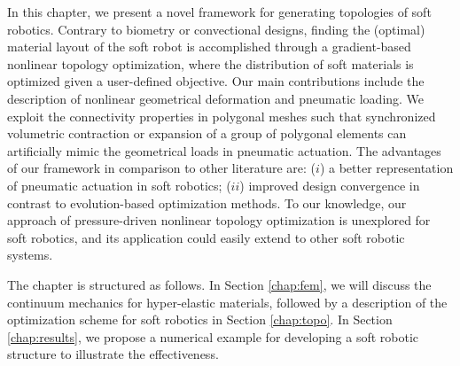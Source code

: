 In this chapter, we present a novel framework for generating topologies of soft robotics. Contrary to biometry or convectional designs, finding the (optimal) material layout of the soft robot is accomplished through a gradient-based nonlinear topology optimization, where the distribution of soft materials is optimized given a user-defined objective. Our main contributions include the description of nonlinear geometrical deformation and pneumatic loading. We exploit the connectivity properties in polygonal meshes such that synchronized volumetric contraction or expansion of a group of polygonal elements can artificially mimic the geometrical loads in pneumatic actuation. The advantages of our framework in comparison to other literature are: ($i$) a better representation of pneumatic actuation in soft robotics; ($ii$) improved design convergence in contrast to evolution-based optimization methods. To our knowledge, our approach of pressure-driven nonlinear topology optimization is unexplored for soft robotics, and its application could easily extend to other soft robotic systems.

The chapter is structured as follows. In Section \ref{chap:fem}, we will discuss the continuum mechanics for hyper-elastic materials, followed by a description of the optimization scheme for soft robotics in Section \ref{chap:topo}. In Section \ref{chap:results}, we propose a numerical example for developing a soft robotic structure to illustrate the effectiveness.
